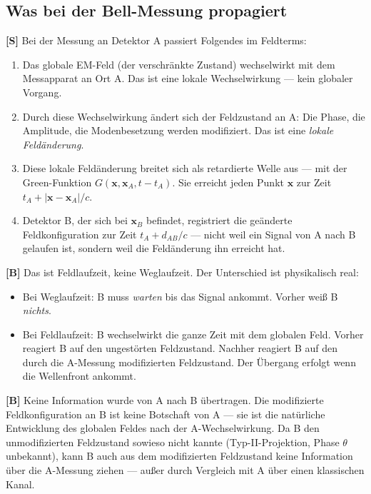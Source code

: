 \subsection{Was bei der Bell-Messung propagiert}

\textbf{[S]} Bei der Messung an Detektor A passiert Folgendes im
Feldterms:

\begin{enumerate}[leftmargin=1.6em,itemsep=0.3em]
  \item Das globale EM-Feld (der verschränkte Zustand) wechselwirkt
    mit dem Messapparat an Ort A. Das ist eine lokale Wechselwirkung
    --- kein globaler Vorgang.
  \item Durch diese Wechselwirkung ändert sich der Feldzustand an A:
    Die Phase, die Amplitude, die Modenbesetzung werden modifiziert.
    Das ist eine \emph{lokale Feldänderung}.
  \item Diese lokale Feldänderung breitet sich als retardierte Welle
    aus --- mit der Green-Funktion $G(\mathbf{x}, \mathbf{x}_A, t-t_A)$.
    Sie erreicht jeden Punkt $\mathbf{x}$ zur Zeit $t_A + |\mathbf{x} -
    \mathbf{x}_A|/c$.
  \item Detektor B, der sich bei $\mathbf{x}_B$ befindet, registriert
    die geänderte Feldkonfiguration zur Zeit $t_A + d_{AB}/c$ --- nicht
    weil ein Signal von A nach B gelaufen ist, sondern weil die
    Feldänderung ihn erreicht hat.
\end{enumerate}

\textbf{[B]} Das ist Feldlaufzeit, keine Weglaufzeit. Der Unterschied
ist physikalisch real:

\begin{itemize}[leftmargin=1.4em,itemsep=0.2em]
  \item Bei Weglaufzeit: B muss \emph{warten} bis das Signal ankommt.
    Vorher weiß B \emph{nichts}.
  \item Bei Feldlaufzeit: B wechselwirkt die ganze Zeit mit dem
    globalen Feld. Vorher reagiert B auf den ungestörten Feldzustand.
    Nachher reagiert B auf den durch die A-Messung modifizierten
    Feldzustand. Der Übergang erfolgt wenn die Wellenfront ankommt.
\end{itemize}

\textbf{[B]} Keine Information wurde von A nach B übertragen.
Die modifizierte Feldkonfiguration an B ist keine Botschaft von A ---
sie ist die natürliche Entwicklung des globalen Feldes nach der
A-Wechselwirkung. Da B den unmodifizierten Feldzustand sowieso
nicht kannte (Typ-II-Projektion, Phase $\theta$ unbekannt), kann B
auch aus dem modifizierten Feldzustand keine Information über die
A-Messung ziehen --- außer durch Vergleich mit A über einen
klassischen Kanal.

